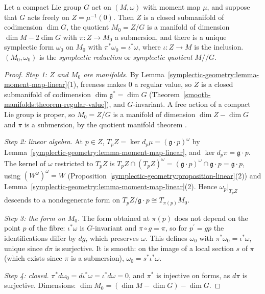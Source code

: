 \begin{theorem}\label{symplectic-geometry:theorem-reduction}
Let a compact Lie group $G$ act on $(M, \omega)$ with moment map $\mu$, and suppose that $G$ acts freely on $Z = \mu^{-1}(0)$. Then $Z$ is a closed submanifold of codimension $\dim G$, the quotient
$M_0 = Z/G$ is a manifold of dimension $\dim M - 2\dim G$ with $\pi \colon Z \to M_0$ a submersion, and there is a unique symplectic form $\omega_0$ on $M_0$ with $\pi^*\omega_0 = \iota^*\omega$, where
$\iota \colon Z \to M$ is the inclusion. $(M_0, \omega_0)$ is the \emph{symplectic reduction} or \emph{symplectic quotient} $M /\!\!/ G$.
\end{theorem}

\begin{proof}
\emph{Step 1: $Z$ and $M_0$ are manifolds.} By Lemma~\ref{symplectic-geometry:lemma-moment-map-linear}(1), freeness makes $0$ a regular value, so $Z$ is a closed submanifold of codimension $\dim\mathfrak{g}^* = \dim G$
(Theorem~\ref{smooth-manifolds:theorem-regular-value}), and $G$-invariant. A free action of a compact Lie group is proper, so $M_0 = Z/G$ is a manifold of dimension $\dim Z - \dim G$ and $\pi$ is a submersion, by the
quotient manifold theorem \cite[Theorem 21.10]{lee-smooth-manifolds}.

\emph{Step 2: linear algebra.} At $p \in Z$, $T_pZ = \ker d_p\mu = (\mathfrak{g} \cdot p)^\omega$ by Lemma~\ref{symplectic-geometry:lemma-moment-map-linear}, and $\ker d_p\pi = \mathfrak{g} \cdot p$. The kernel of $\omega$
restricted to $T_pZ$ is $T_pZ \cap (T_pZ)^\omega = (\mathfrak{g} \cdot p)^\omega \cap \mathfrak{g} \cdot p = \mathfrak{g} \cdot p$, using $(W^\omega)^\omega = W$ (Proposition~\ref{symplectic-geometry:proposition-linear}(2))
and Lemma~\ref{symplectic-geometry:lemma-moment-map-linear}(2). Hence $\omega_p|_{T_pZ}$ descends to a nondegenerate form on $T_pZ/\mathfrak{g} \cdot p \cong T_{\pi(p)}M_0$.

\emph{Step 3: the form on $M_0$.} The form obtained at $\pi(p)$ does not depend on the point $p$ of the fibre: $\iota^*\omega$ is $G$-invariant and $\pi \circ g = \pi$, so for $p^{\prime} = gp$ the identifications differ
by $dg$, which preserves $\omega$. This defines $\omega_0$ with $\pi^*\omega_0 = \iota^*\omega$, unique since $d\pi$ is surjective. It is smooth: on the image of a local section $s$ of $\pi$ (which exists since $\pi$ is a
submersion), $\omega_0 = s^*\iota^*\omega$.

\emph{Step 4: closed.} $\pi^*d\omega_0 = d\iota^*\omega = \iota^*d\omega = 0$, and $\pi^*$ is injective on forms, as $d\pi$ is surjective. Dimensions: $\dim M_0 = (\dim M - \dim G) - \dim G$.
\end{proof}

